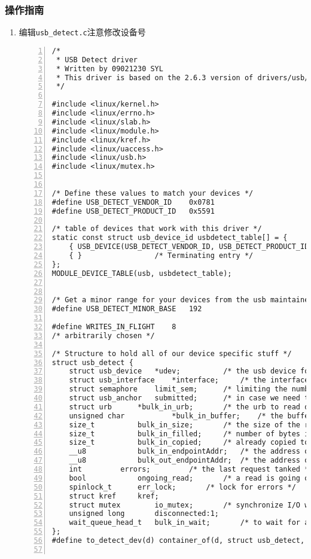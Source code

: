 \documentclass{article}
\begin{document}
\subsubsection{操作指南}
\begin{enumerate}
	\item 编辑\verb|usb_detect.c|注意修改设备号
	      \begin{lstlisting}[numbers=left]
/*
 * USB Detect driver
 * Written by 09021230 SYL
 * This driver is based on the 2.6.3 version of drivers/usb/usb-skeleton.c
 */

#include <linux/kernel.h>
#include <linux/errno.h>
#include <linux/slab.h>
#include <linux/module.h>
#include <linux/kref.h>
#include <linux/uaccess.h>
#include <linux/usb.h>
#include <linux/mutex.h>


/* Define these values to match your devices */
#define USB_DETECT_VENDOR_ID	0x0781
#define USB_DETECT_PRODUCT_ID	0x5591

/* table of devices that work with this driver */
static const struct usb_device_id usbdetect_table[] = {
	{ USB_DEVICE(USB_DETECT_VENDOR_ID, USB_DETECT_PRODUCT_ID) },
	{ }					/* Terminating entry */
};
MODULE_DEVICE_TABLE(usb, usbdetect_table);


/* Get a minor range for your devices from the usb maintainer */
#define USB_DETECT_MINOR_BASE	192

#define WRITES_IN_FLIGHT	8
/* arbitrarily chosen */

/* Structure to hold all of our device specific stuff */
struct usb_detect {
	struct usb_device	*udev;			/* the usb device for this device */
	struct usb_interface	*interface;		/* the interface for this device */
	struct semaphore	limit_sem;		/* limiting the number of writes in progress */
	struct usb_anchor	submitted;		/* in case we need to retract our submissions */
	struct urb		*bulk_in_urb;		/* the urb to read data with */
	unsigned char           *bulk_in_buffer;	/* the buffer to receive data */
	size_t			bulk_in_size;		/* the size of the receive buffer */
	size_t			bulk_in_filled;		/* number of bytes in the buffer */
	size_t			bulk_in_copied;		/* already copied to user space */
	__u8			bulk_in_endpointAddr;	/* the address of the bulk in endpoint */
	__u8			bulk_out_endpointAddr;	/* the address of the bulk out endpoint */
	int			errors;			/* the last request tanked */
	bool			ongoing_read;		/* a read is going on */
	spinlock_t		err_lock;		/* lock for errors */
	struct kref		kref;
	struct mutex		io_mutex;		/* synchronize I/O with disconnect */
	unsigned long		disconnected:1;
	wait_queue_head_t	bulk_in_wait;		/* to wait for an ongoing read */
};
#define to_detect_dev(d) container_of(d, struct usb_detect, kref)


\end{lstlisting}
\end{enumerate}
\end{document}
